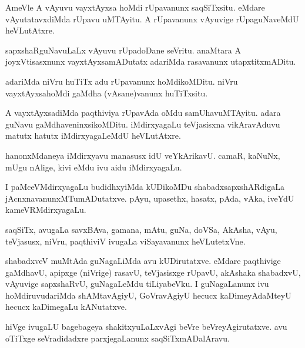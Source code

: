 \documentclass{article}
\begin{document}
\begin{mn}%
AmeVle A vAyuvu vayxtAyxsa hoMdi rUpavanunx saqSiTxsitu. eMdare
vAyutatavxdiMda rUpavu uMTAyitu. A rUpavanunx vAyuvige rUpaguNaveMdU heVLutAtxre.
\end{mn}

\begin{mn}
sapxshaRguNavuLaLx vAyuvu rUpadoDane seVritu. anaMtara A
joyxVtisasxnunx vayxtAyxsamADutatx adariMda rasavanunx utapxtitxmADitu.
\end{mn}

\begin{mn}
adariMda niVru huTiTx adu rUpavanunx hoMdikoMDitu. niVru
vayxtAyxsahoMdi gaMdha (vAsane)vanunx huTiTxsitu.
\end{mn}

\begin{mn}
A vayxtAyxsadiMda paqthiviya rUpavAda oMdu samUhavuMTAyitu. adara
guNavu gaMdhaveninxsikoMDitu. iMdirxyagaLu teVjasisxna vikAravAduvu
matutx hatutx iMdirxyagaLeMdU heVLutAtxre.
\end{mn}

\begin{mn}
hanonxMdaneya iMdirxyavu manasusx idU veYkArikavU. camaR, kaNuNx, mUgu
nAlige, kivi eMdu ivu aidu iMdirxyagaLu.
\end{mn}

\begin{mn}%
I paMceVMdirxyagaLu budidhxyiMda kUDikoMDu shabadxsapxshARdigaLa
jAcnxnavanunxMTumADutatxve. pAyu, upasethx, hasatx, pAda, vAka, iveYdU kameVRMdirxyagaLu.
\end{mn}

\begin{mn}
saqSiTx, avugaLa savxBAva, gamana, mAtu, guNa, doVSa, AkAsha, vAyu,
teVjasusx, niVru, paqthiviV ivugaLa viSayavanunx heVLutetxVne.
\end{mn}

\begin{mn}
shabadxveV muMtAda guNagaLiMda avu kUDirutatxve. eMdare paqthivige
gaMdhavU, apipxge (niVrige) rasavU, teVjasisxge rUpavU, akAshaka
shabadxvU, vAyuvige sapxshaRvU, guNagaLeMdu tiLiyabeVku. I
guNagaLanunx ivu hoMdiruvudariMda shAMtavAgiyU, GoVravAgiyU hecucx
kaDimeyAdaMteyU hecucx kaDimegaLu kANutatxve.
\end{mn}

\begin{mn}
hiVge ivugaLU bagebageya shakitxyuLaLxvAgi beVre
beVreyAgirutatxve. avu oTiTxge seVradidadxre parxjegaLanunx saqSiTxmADalAravu.
\end{mn}
\end{document}
